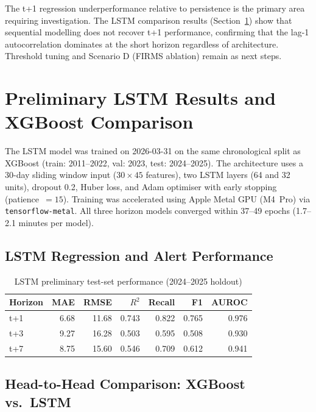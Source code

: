 \documentclass[12pt,a4paper]{report}
\begin{document}
The t+1 regression underperformance relative to persistence is the primary area requiring investigation. The LSTM comparison results (Section~\ref{sec:lstm_results}) show that sequential modelling does not recover t+1 performance, confirming that the lag-1 autocorrelation dominates at the short horizon regardless of architecture. Threshold tuning and Scenario D (FIRMS ablation) remain as next steps.

\section{Preliminary LSTM Results and XGBoost Comparison}
\label{sec:lstm_results}

The LSTM model was trained on 2026-03-31 on the same chronological split as XGBoost (train: 2011--2022, val: 2023, test: 2024--2025). The architecture uses a 30-day sliding window input ($30 \times 45$ features), two LSTM layers (64 and 32 units), dropout 0.2, Huber loss, and Adam optimiser with early stopping (patience~$=15$). Training was accelerated using Apple Metal GPU (M4~Pro) via \texttt{tensorflow-metal}. All three horizon models converged within 37--49 epochs (1.7--2.1 minutes per model).

\subsection{LSTM Regression and Alert Performance}

\begin{table}[H]
\centering
\caption{LSTM preliminary test-set performance (2024--2025 holdout)}
\label{tab:lstm_prelim}
\begin{tabular}{@{}lrrrrrr@{}}
\toprule
\textbf{Horizon} & \textbf{MAE} & \textbf{RMSE} & \textbf{$R^2$} & \textbf{Recall} & \textbf{F1} & \textbf{AUROC} \\
\midrule
t+1 & 6.68 & 11.68 & 0.743 & 0.822 & 0.765 & 0.976 \\
t+3 & 9.27 & 16.28 & 0.503 & 0.595 & 0.508 & 0.930 \\
t+7 & 8.75 & 15.60 & 0.546 & 0.709 & 0.612 & 0.941 \\
\bottomrule
\end{tabular}
\end{table}

\subsection{Head-to-Head Comparison: XGBoost vs.\ LSTM}
\end{document}
